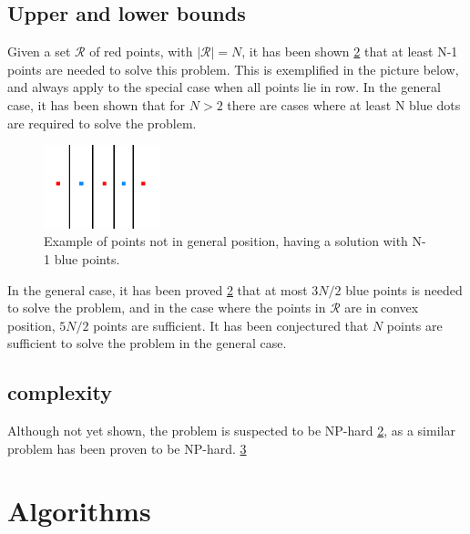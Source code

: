 \documentclass[a4paper,12pt]{article}
\begin{document}
\subsection{Upper and lower bounds}
Given a set $\mathcal{R}$ of red points, with $|\mathcal{R}| = N$, it has been shown \hyperref[ref:blocking]{2} that at least N-1 points are needed to solve this problem. This is exemplified in the picture below, and always apply to the special case when all points lie in row. In the general case, it has been shown that for $N>2$ there are cases where at least N blue dots are required to solve the problem.

\begin{figure}[hb]
\centering
\includegraphics[width=0.3\textwidth]{pictures/N-1solution.png}
 \caption[Close up of \textit{Hemidactylus} sp.]
{Example of points not in general position, having a solution with N-1 blue points.}
\end{figure}

In the general case, it has been proved \hyperref[ref:blocking]{2} that at most $3N/2$ blue points is needed to solve the problem, and in the case where the points in  $\mathcal{R}$ are in convex position, $5N/2$ points are sufficient. It has been conjectured that $N$ points are sufficient to solve the problem in the general case.


\subsection{complexity}
Although not yet shown, the problem is suspected to be NP-hard \hyperref[ref:blocking]{2}, as a similar problem has been proven to be NP-hard. \hyperref[ref:alexander]{3}

\section{Algorithms}
\end{document}
